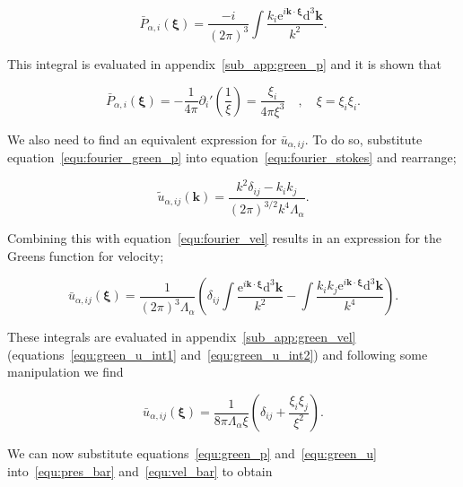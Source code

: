 \documentclass[12pt]{article}
\begin{document}
\begin{equation}
\label{equ:green_p_int}
\bar{P}_{\alpha, i} (\boldsymbol\xi) = \frac{-i}{(2 \pi)^{3}} \int \frac{k_{i} \mathrm{e}^{i \boldsymbol{k} \cdot \boldsymbol{\xi}} \mathrm{d}^{3} \boldsymbol{k}}{k^{2}} .
\end{equation}

This integral is evaluated in appendix~\ref{sub_app:green_p} and it is shown that

\begin{equation}
\label{equ:green_p}
\bar{P}_{\alpha, i} (\boldsymbol\xi) = -\frac{1}{4 \pi} \partial_{i}' \left(\frac{1}{\xi}\right) = \frac{\xi_{i}}{4 \pi \xi^{3}} \quad , \quad \xi = \xi_{i} \xi_{i} .
\end{equation}

We also need to find an equivalent expression for $\bar{u}_{\alpha,ij}$. To do so, substitute equation~\ref{equ:fourier_green_p} into equation~\ref{equ:fourier_stokes} and rearrange;

\begin{equation}
\label{equ:fourier_green_u}
\tilde{u}_{\alpha,ij} (\boldsymbol{k}) = \frac{k^{2} \delta_{ij} - k_{i} k_{j}}{(2 \pi)^{3/2} k^{4} \Lambda_{\alpha}} .
\end{equation}

Combining this with equation~\ref{equ:fourier_vel} results in an expression for the Greens function for velocity;

\begin{equation}
\label{equ:green_u_int}
\bar{u}_{\alpha,ij} (\boldsymbol\xi) = \frac{1}{(2 \pi)^{3} \Lambda_{\alpha}} \left(\delta_{ij} \int \frac{\mathrm{e}^{i \boldsymbol{k} \cdot \boldsymbol\xi} \mathrm{d}^{3} \boldsymbol{k}}{k^{2}} - \int \frac{k_{i} k_{j} \mathrm{e}^{i \boldsymbol{k} \cdot \boldsymbol\xi} \mathrm{d}^{3} \boldsymbol{k}}{k^{4}} \right).
\end{equation}

These integrals are evaluated in appendix~\ref{sub_app:green_vel} (equations~\ref{equ:green_u_int1} and~\ref{equ:green_u_int2}) and following some manipulation we find

\begin{equation}
\label{equ:green_u}
\bar{u}_{\alpha,ij} (\boldsymbol\xi) = \frac{1}{8 \pi \Lambda_{\alpha} \xi} \left(\delta_{ij} + \frac{\xi_{i} \xi_{j}}{\xi^{2}} \right).
\end{equation}

We can now substitute equations~\ref{equ:green_p} and~\ref{equ:green_u} into~\ref{equ:pres_bar} and~\ref{equ:vel_bar} to obtain
\end{document}
